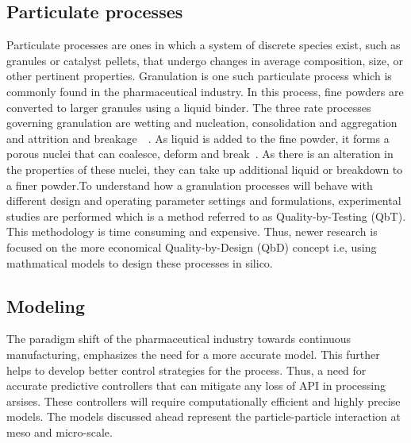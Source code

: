 \documentclass[preprint,11pt,authoryear]{elsarticle}
\begin{document}
\subsection{Particulate processes}
Particulate processes are ones in which a system of discrete species exist,
such as granules or catalyst pellets, that undergo changes in average
composition, size, or other pertinent properties. Granulation is one such
particulate process which is commonly found in the pharmaceutical industry. In
this process, fine powders are converted to larger granules using a liquid
binder. The three rate processes governing granulation are wetting and
nucleation, consolidation and aggregation and attrition and
breakage~\citep{Iveson2001}~\citep{Cameron2005}. As liquid is added to the
fine powder, it forms a porous nuclei that can coalesce, deform and
break~\citep{Barrasso2015ces}. As there is an alteration in the properties of
these nuclei, they can take up additional liquid or breakdown to a finer
powder.To understand how a granulation processes will behave with different
design and operating parameter settings and formulations, experimental studies
are performed which is a method referred to as Quality-by-Testing (QbT). This
methodology is time consuming and expensive. Thus, newer research is focused
on the more economical Quality-by-Design (QbD) concept i.e, using mathmatical 
models to design these processes in silico.

\subsection{Modeling}
The paradigm shift of the pharmaceutical industry towards continuous 
manufacturing, emphasizes the need for a more accurate model. This
further helps to develop better control strategies for the process. 
Thus, a need for accurate predictive controllers that can 
mitigate any loss of API in processing arsises. These controllers will
require computationally efficient and highly precise models. The models
discussed ahead represent the particle-particle interaction at meso and micro-scale.
\end{document}
